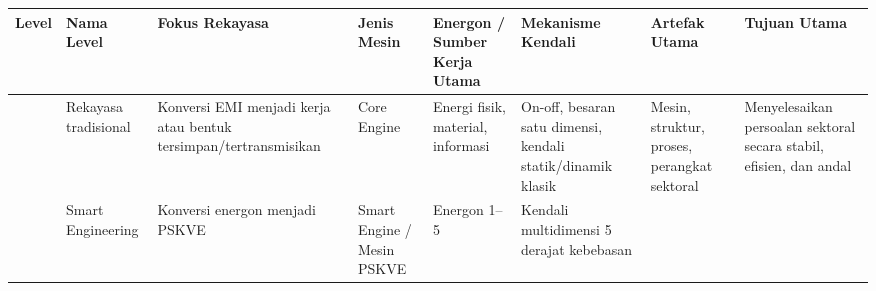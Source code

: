 \documentclass[
  letterpaper,
  DIV=11,
  numbers=noendperiod]{scrreprt}
\newcounter{none} %
\begin{document}
{\def\LTcaptype{none} %
\begin{longtable}[]{@{}
  >{\raggedright\arraybackslash}p{}
  >{\raggedright\arraybackslash}p{}
  >{\raggedright\arraybackslash}p{}
  >{\raggedright\arraybackslash}p{}
  >{\raggedright\arraybackslash}p{}
  >{\raggedright\arraybackslash}p{}
  >{\raggedright\arraybackslash}p{}
  >{\raggedright\arraybackslash}p{}@{}}
\toprule\noalign{}
\begin{minipage}[b]{\linewidth}\raggedright
Level
\end{minipage} & \begin{minipage}[b]{\linewidth}\raggedright
Nama Level
\end{minipage} & \begin{minipage}[b]{\linewidth}\raggedright
Fokus Rekayasa
\end{minipage} & \begin{minipage}[b]{\linewidth}\raggedright
Jenis Mesin
\end{minipage} & \begin{minipage}[b]{\linewidth}\raggedright
Energon / Sumber Kerja Utama
\end{minipage} & \begin{minipage}[b]{\linewidth}\raggedright
Mekanisme Kendali
\end{minipage} & \begin{minipage}[b]{\linewidth}\raggedright
Artefak Utama
\end{minipage} & \begin{minipage}[b]{\linewidth}\raggedright
Tujuan Utama
\end{minipage} \\
\midrule\noalign{}
\endhead
\bottomrule\noalign{}
\endlastfoot
0 & Rekayasa tradisional & Konversi EMI menjadi kerja atau bentuk
tersimpan/tertransmisikan & Core Engine & Energi fisik, material,
informasi & On-off, besaran satu dimensi, kendali statik/dinamik klasik
& Mesin, struktur, proses, perangkat sektoral & Menyelesaikan persoalan
sektoral secara stabil, efisien, dan andal \\
1 & Smart Engineering & Konversi energon menjadi PSKVE & Smart Engine /
Mesin PSKVE & Energon 1--5 & Kendali multidimensi 5 derajat kebebasan &

\end{longtable}}
\end{document}
